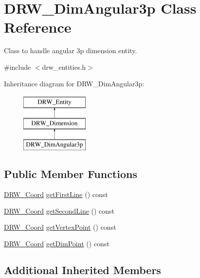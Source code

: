 \hypertarget{class_d_r_w___dim_angular3p}{}\section{D\+R\+W\+\_\+\+Dim\+Angular3p Class Reference}
\label{class_d_r_w___dim_angular3p}


Class to handle angular 3p dimension entity.  




{\ttfamily \#include $<$drw\+\_\+entities.\+h$>$}

Inheritance diagram for D\+R\+W\+\_\+\+Dim\+Angular3p\+:\begin{figure}[H]
\begin{center}
\leavevmode
\includegraphics[height=3.000000cm]{d3/d32/class_d_r_w___dim_angular3p}
\end{center}
\end{figure}
\subsection*{Public Member Functions}
\begin{DoxyCompactItemize}
\item 
\hyperlink{class_d_r_w___coord}{D\+R\+W\+\_\+\+Coord} \hyperlink{class_d_r_w___dim_angular3p_a4b103b2e28a3f942f105118a84fffbb4}{get\+First\+Line} () const 
\item 
\hyperlink{class_d_r_w___coord}{D\+R\+W\+\_\+\+Coord} \hyperlink{class_d_r_w___dim_angular3p_aa240abbba2c8ce180e23c93e29ec604e}{get\+Second\+Line} () const 
\item 
\hyperlink{class_d_r_w___coord}{D\+R\+W\+\_\+\+Coord} \hyperlink{class_d_r_w___dim_angular3p_a331a4f869b667c46405c066eb819669e}{get\+Vertex\+Point} () const 
\item 
\hyperlink{class_d_r_w___coord}{D\+R\+W\+\_\+\+Coord} \hyperlink{class_d_r_w___dim_angular3p_abb2ea0c545d83aafbcc2d58b9ba959be}{get\+Dim\+Point} () const 
\end{DoxyCompactItemize}
\subsection*{Additional Inherited Members}


